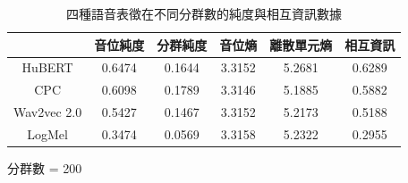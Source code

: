 {\begin{table}[!htbp]
    \begin{subtable}[t]{\textwidth}
        \centering
        \begin{tabular}{|c|c|c|c|c|c|} \hline
                        & 音位純度   & 分群純度   & 音位熵    & 離散單元熵  & 相互資訊   \\ \hline
            HuBERT      &     0.6474 &     0.1644 &    3.3152 &      5.2681 & 0.6289 \\ \hline    %
            CPC         &     0.6098 &     0.1789 &    3.3146 &      5.1885 & 0.5882 \\ \hline    %
            Wav2vec 2.0 &     0.5427 &     0.1467 &    3.3152 &      5.2173 & 0.5188 \\ \hline    %
            LogMel      &     0.3474 &     0.0569 &    3.3158 &      5.2322 & 0.2955 \\ \hline    %
        \end{tabular}
        \caption{分群數 = 200}
        \label{tab:ch3-clu200-phn}
    \end{subtable}

    \caption{四種語音表徵在不同分群數的純度與相互資訊數據}
    \label{tab:single-cluster-results}
\end{table}

}  %
